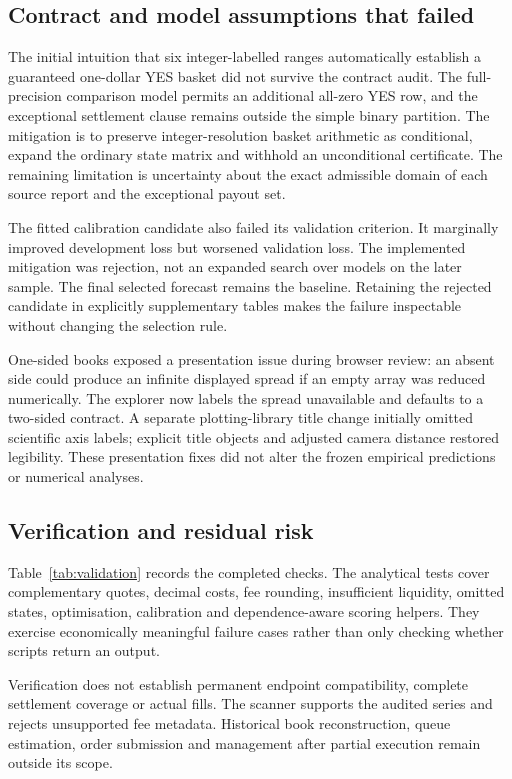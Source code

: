 \subsection{Contract and model assumptions that failed}
The initial intuition that six integer-labelled ranges automatically establish a guaranteed one-dollar YES basket did not survive the contract audit. The full-precision comparison model permits an additional all-zero YES row, and the exceptional settlement clause remains outside the simple binary partition. The mitigation is to preserve integer-resolution basket arithmetic as conditional, expand the ordinary state matrix and withhold an unconditional certificate. The remaining limitation is uncertainty about the exact admissible domain of each source report and the exceptional payout set.

The fitted calibration candidate also failed its validation criterion. It marginally improved development loss but worsened validation loss. The implemented mitigation was rejection, not an expanded search over models on the later sample. The final selected forecast remains the baseline. Retaining the rejected candidate in explicitly supplementary tables makes the failure inspectable without changing the selection rule.

One-sided books exposed a presentation issue during browser review: an absent side could produce an infinite displayed spread if an empty array was reduced numerically. The explorer now labels the spread unavailable and defaults to a two-sided contract. A separate plotting-library title change initially omitted scientific axis labels; explicit title objects and adjusted camera distance restored legibility. These presentation fixes did not alter the frozen empirical predictions or numerical analyses.

\subsection{Verification and residual risk}
Table~\ref{tab:validation} records the completed checks. The analytical tests cover complementary quotes, decimal costs, fee rounding, insufficient liquidity, omitted states, optimisation, calibration and dependence-aware scoring helpers. They exercise economically meaningful failure cases rather than only checking whether scripts return an output.


Verification does not establish permanent endpoint compatibility, complete settlement coverage or actual fills. The scanner supports the audited series and rejects unsupported fee metadata. Historical book reconstruction, queue estimation, order submission and management after partial execution remain outside its scope.

